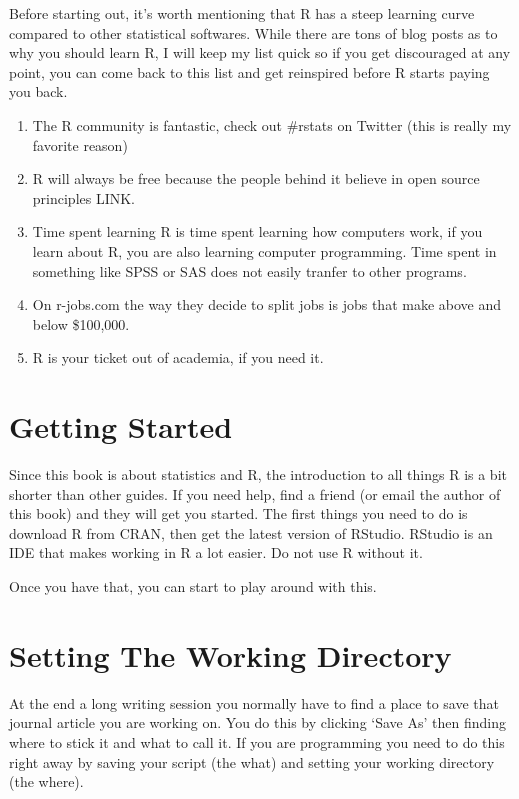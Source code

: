 \documentclass[]{book}
\providecommand{\tightlist}{%
  \setlength{\itemsep}{0pt}\setlength{\parskip}{0pt}}
\theoremstyle{definition}
\theoremstyle{definition}
\theoremstyle{definition}
\theoremstyle{remark}
\begin{document}
Before starting out, it's worth mentioning that R has a steep learning
curve compared to other statistical softwares. While there are tons of
blog posts as to why you should learn R, I will keep my list quick so if
you get discouraged at any point, you can come back to this list and get
reinspired before R starts paying you back.

\begin{enumerate}
\def\labelenumi{\arabic{enumi}.}
\tightlist
\item
  The R community is fantastic, check out \#rstats on Twitter (this is
  really my favorite reason)
\item
  R will always be free because the people behind it believe in open
  source principles LINK.
\item
  Time spent learning R is time spent learning how computers work, if
  you learn about R, you are also learning computer programming. Time
  spent in something like SPSS or SAS does not easily tranfer to other
  programs.
\item
  On r-jobs.com the way they decide to split jobs is jobs that make
  above and below \$100,000.
\item
  R is your ticket out of academia, if you need it.
\end{enumerate}

\section{Getting Started}\label{getting-started}

Since this book is about statistics and R, the introduction to all
things R is a bit shorter than other guides. If you need help, find a
friend (or email the author of this book) and they will get you started.
The first things you need to do is download R from CRAN, then get the
latest version of RStudio. RStudio is an IDE that makes working in R a
lot easier. Do not use R without it.

Once you have that, you can start to play around with this.

\section{Setting The Working
Directory}\label{setting-the-working-directory}

At the end a long writing session you normally have to find a place to
save that journal article you are working on. You do this by clicking
`Save As' then finding where to stick it and what to call it. If you are
programming you need to do this right away by saving your script (the
what) and setting your working directory (the where).
\end{document}
